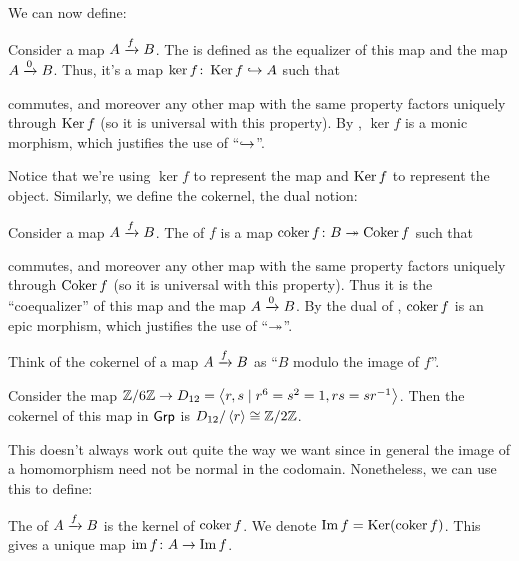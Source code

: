 We can now define:
\begin{definition}
	Consider a map $A \xrightarrow{f} B$.
	The  is defined as the equalizer of this map and the map $A \xrightarrow{0} B$.
	Thus, it's a map $\ker f \colon \operatorname{Ker} f \hookrightarrow A$ such that
	\begin{center}
	\end{center}
	commutes, and moreover any other map with the same property factors uniquely through $\operatorname{Ker} f$
	(so it is universal with this property).
	By , $\ker f$ is a monic morphism,
	which justifies the use of ``$\hookrightarrow$''.
\end{definition}
Notice that we're using $\ker f$ to represent the map and $\operatorname{Ker} f$ to represent the object.
Similarly, we define the cokernel, the dual notion:
\begin{definition}
	Consider a map $A \xrightarrow{f} B$.
	The  of $f$ is a map $\operatorname{coker} f \colon B \twoheadrightarrow \operatorname{Coker} f$ such that
	\begin{center}
	\end{center}
	commutes, and moreover any other map with the same property factors
	uniquely through $\operatorname{Coker} f$ (so it is universal with this property).
	Thus it is the ``coequalizer'' of this map and the map $A \xrightarrow{0} B$.
	By the dual of , $\operatorname{coker} f$ is an epic morphism,
	which justifies the use of ``$\twoheadrightarrow$''.
\end{definition}
Think of the cokernel of a map $A \xrightarrow{f} B$ as ``$B$ modulo the image of $f$''.
\begin{example}
	[Cokernels]
	Consider the map $\mathbb Z/6\mathbb Z \to D_{12} = \left\langle r,s \mid r^6=s^2=1, rs=sr^{-1}\right\rangle$.
	Then the cokernel of this map in $\mathsf{Grp}$ is $D_{12} / \left\langle r \right\rangle \cong \mathbb Z/2\mathbb Z$.
\end{example}
This doesn't always work out quite the way we want since in general the image of
a homomorphism need not be normal in the codomain.
Nonetheless, we can use this to define:
\begin{definition}
	The  of $A \xrightarrow{f} B$ is the kernel of $\operatorname{coker} f$.
	We denote $\operatorname{Im} f = \operatorname{Ker}(\operatorname{coker} f)$.
	This gives a unique map $\operatorname{im} f \colon A \to \operatorname{Im} f$.
\end{definition}
